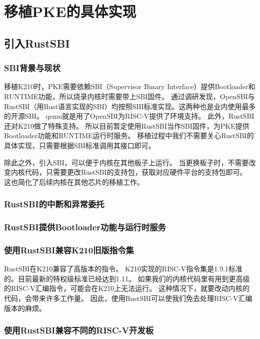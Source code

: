 \chapter{移植PKE的具体实现}

\section{引入RustSBI}

\subsection{SBI背景与现状}

移植K210时，PKE需要依赖SBI（Supervisor Binary Interface）提供Bootloader和RUNTIME功能，所以烧录内核时需要带上SBI固件。
通过调研发现，OpenSBI与RustSBI（用Rust语言实现的SBI）均按照SBI标准实现。这两种也是业内使用最多的开源SBI。
qemu就是用了OpenSBI为RISC-V提供了环境支持。
此外，RustSBI还对K210做了特殊支持。
所以目前暂定使用RustSBI当作SBI固件，为PKE提供Bootloader功能和RUNTIME运行时服务。
移植过程中我们不需要关心RustSBI的具体实现，只需要根据SBI标准调用其接口即可。

除此之外，引入SBI，可以便于内核在其他板子上运行。
当更换板子时，不需要改变内核代码，只需要更改RustSBI的支持包，获取对应硬件平台的支持包即可。
这也简化了后续内核在其他芯片的移植工作。

\subsection{RustSBI的中断和异常委托}

\subsection{RustSBI提供Bootloader功能与运行时服务}

\subsection{使用RustSBI兼容K210旧版指令集}

RustSBI在K210兼容了高版本的指令。
K210实现的RISC-V指令集是1.9.1标准的。目前最新的特权级标准已经达到1.11。
如果我们的内核代码里有用到更高级的RISC-V汇编指令，可能会在K210上无法运行。
这种情况下，就要改动内核的代码，会带来许多工作量。
因此，使用RustSBI可以使我们免去处理RISC-V汇编版本的麻烦。

\subsection{使用RustSBI兼容不同的RISC-V开发板}

